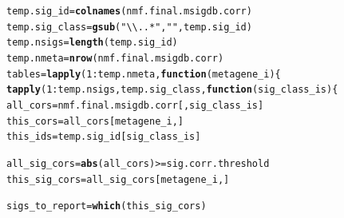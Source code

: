 \documentclass{article}\usepackage[]{graphicx}\usepackage[]{color}
\makeatletter
\newcommand{\hlnum}[1]{\textcolor[rgb]{0.686,0.059,0.569}{#1}}%
\newcommand{\hlstr}[1]{\textcolor[rgb]{0.192,0.494,0.8}{#1}}%
\newcommand{\hlopt}[1]{\textcolor[rgb]{0,0,0}{#1}}%
\newcommand{\hlstd}[1]{\textcolor[rgb]{0.345,0.345,0.345}{#1}}%
\newcommand{\hlkwa}[1]{\textcolor[rgb]{0.161,0.373,0.58}{\textbf{#1}}}%
\newcommand{\hlkwb}[1]{\textcolor[rgb]{0.69,0.353,0.396}{#1}}%
\newcommand{\hlkwc}[1]{\textcolor[rgb]{0.333,0.667,0.333}{#1}}%
\newcommand{\hlkwd}[1]{\textcolor[rgb]{0.737,0.353,0.396}{\textbf{#1}}}%
\newenvironment{kframe}{%
 \def\at@end@of@kframe{}%
 \ifinner\ifhmode%
  \def\at@end@of@kframe{\end{minipage}}%
  \begin{minipage}{\columnwidth}%
 \fi\fi%
 \def\FrameCommand##1{\hskip\@totalleftmargin \hskip-\fboxsep
 \colorbox{shadecolor}{##1}\hskip-\fboxsep
     \hskip-\linewidth \hskip-\@totalleftmargin \hskip\columnwidth}%
 \MakeFramed {\advance\hsize-\width
   \@totalleftmargin\z@ \linewidth\hsize
   \@setminipage}}%
 {\par\unskip\endMakeFramed%
 \at@end@of@kframe}
\newenvironment{knitrout}{}{} %
\makeatother
\begin{document}
\begin{knitrout}
\color{fgcolor}\begin{kframe}
\begin{alltt}
\hlstd{temp.sig_id} \hlkwb{=} \hlkwd{colnames}\hlstd{(nmf.final.msigdb.corr)}
\hlstd{temp.sig_class} \hlkwb{=} \hlkwd{gsub}\hlstd{(}\hlstr{"\textbackslash{}\textbackslash{}..*"}\hlstd{,} \hlstr{""}\hlstd{, temp.sig_id)}
\hlstd{temp.nsigs} \hlkwb{=} \hlkwd{length}\hlstd{(temp.sig_id)}
\hlstd{temp.nmeta} \hlkwb{=} \hlkwd{nrow}\hlstd{(nmf.final.msigdb.corr)}
\hlstd{tables} \hlkwb{=} \hlkwd{lapply}\hlstd{(}\hlnum{1}\hlopt{:}\hlstd{temp.nmeta,} \hlkwa{function}\hlstd{(}\hlkwc{metagene_i}\hlstd{) \{}
    \hlkwd{tapply}\hlstd{(}\hlnum{1}\hlopt{:}\hlstd{temp.nsigs, temp.sig_class,} \hlkwa{function}\hlstd{(}\hlkwc{sig_class_is}\hlstd{) \{}
        \hlstd{all_cors} \hlkwb{=} \hlstd{nmf.final.msigdb.corr[, sig_class_is]}
        \hlstd{this_cors} \hlkwb{=} \hlstd{all_cors[metagene_i, ]}
        \hlstd{this_ids} \hlkwb{=} \hlstd{temp.sig_id[sig_class_is]}

        \hlstd{all_sig_cors} \hlkwb{=} \hlkwd{abs}\hlstd{(all_cors)} \hlopt{>=} \hlstd{sig.corr.threshold}
        \hlstd{this_sig_cors} \hlkwb{=} \hlstd{all_sig_cors[metagene_i, ]}

        \hlstd{sigs_to_report} \hlkwb{=} \hlkwd{which}\hlstd{(this_sig_cors)}


\end{alltt}
\end{kframe}
\end{knitrout}
\end{document}
